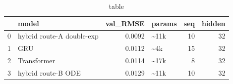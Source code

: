 \begin{table}
\caption{table}
\label{tab:table}
\begin{tabular}{llrlrr}
\toprule
 & model & val\_RMSE & params & seq & hidden \\
\midrule
0 & hybrid route-A double-exp & 0.0092 & \textasciitilde 11k & 10 & 32 \\
1 & GRU & 0.0112 & \textasciitilde 4k & 15 & 32 \\
2 & Transformer & 0.0114 & \textasciitilde 17k & 8 & 32 \\
3 & hybrid route-B ODE & 0.0129 & \textasciitilde 11k & 10 & 32 \\
\bottomrule
\end{tabular}
\end{table}
